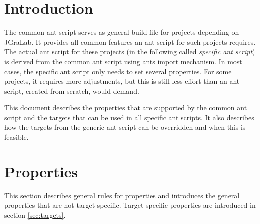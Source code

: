 \documentclass[a4paper,twoside,11pt,bibtotoc]{article}
\begin{document}
\sloppy

\begin{titlepage}



\end{titlepage}




\section{Introduction}
The common ant script serves as general build file for projects depending on JGraLab.
It provides all common features an ant script for such projects requires.
The actual ant script for these projects (in the following called \emph{specific ant script}) is derived from the common ant script using ants import mechanism.
In most cases, the specific ant script only needs to set several properties.
For some projects, it requires more adjustments, but this is still less effort than an ant script, created from scratch, would demand.

This document describes the properties that are supported by the common ant script and the targets that can be used in all specific ant scripts.
It also describes how the targets from the generic ant script can be overridden and when this is feasible.

\section{Properties}
\label{sec:properties}
This section describes general rules for properties and introduces the general properties that are not target specific.
Target specific properties are introduced in section \ref{sec:targets}.
\end{document}
